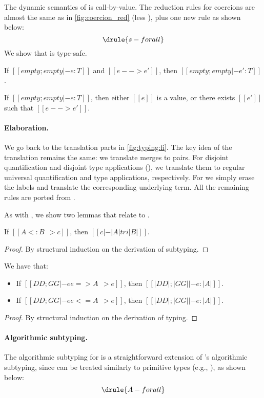 The dynamic semantics of \tnamee is call-by-value. The reduction rules for coercions are almost the same as in
\cref{fig:coercion_red} (less ), plus one new rule  as shown below:
\[
  \drule{s-forall}
\]
We show that \tnamee is type-safe.

\begin{theorem}
  If $[[empty; empty |- e : T]]$ and $[[e --> e']]$, then $[[empty; empty |- e' : T]]$.
\end{theorem}

\begin{theorem}
  If $[[empty; empty |- e : T]]$, then either $[[e]]$ is a value, or there exists $[[e']]$ such
  that $[[e --> e']]$.
\end{theorem}


\paragraph{Elaboration.}

We go back to the translation parts in \cref{fig:typing:fi}. The key idea of the
translation remains the same: we translate merges to pairs. For disjoint
quantification and disjoint type applications (), we
translate them to regular universal quantification and type applications,
respectively. For  we simply erase
the labels and translate the corresponding underlying term. All the remaining
rules are ported from \namee.


As with \namee, we show two lemmas that relate \fnamee to \tnamee.

\begin{lemma}
  If $[[A <: B ~~> c]]$, then $[[c |-  |A| tri |B|]]$.
  \label{lemma:sub-correct:fi}
\end{lemma}
\begin{proof}
  By structural induction on the derivation of subtyping.
\end{proof}


\begin{lemma} We have that:
  \begin{itemize}
  \item If $[[DD ; GG |- ee => A ~~> e]]$, then $[[ |DD| ; |GG| |- e : |A | ]]$.
  \item If $[[DD ; GG |- ee <= A ~~> e]]$, then $[[ |DD| ; |GG| |- e : |A | ]]$.
  \end{itemize}
\end{lemma}
\begin{proof}
  By structural induction on the derivation of typing.
\end{proof}



\paragraph{Algorithmic subtyping.}

The algorithmic subtyping for \fnamee is a straightforward extension of \namee's
algorithmic subtyping, since  can be treated similarly to
primitive types (e.g., ), as shown below:
\[
  \drule{A-forall}
\]